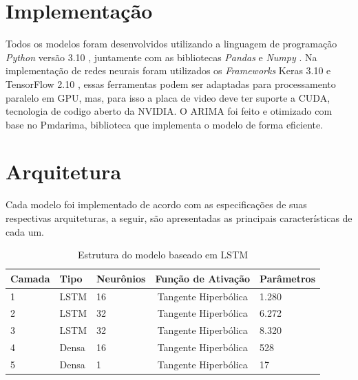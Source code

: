 \section{Implementação} \label{sec:implementacao}
Todos os modelos foram desenvolvidos utilizando a linguagem de programação \textit{Python} versão 3.10 \cite{ramalho}, juntamente com as bibliotecas \textit{Pandas} e \textit{Numpy} \cite{Data}. 
Na implementação de redes neurais foram utilizados os \textit{Frameworks} Keras 3.10 e TensorFlow 2.10 \cite{maosaobra}, essas ferramentas podem ser adaptadas para processamento paralelo em GPU, mas, para isso a placa de video deve ter suporte a CUDA, tecnologia de codigo aberto da NVIDIA.
O ARIMA foi feito e otimizado com base no Pmdarima, biblioteca que implementa o modelo de forma eficiente.

\section{Arquitetura} \label{sec:arquitetura}
Cada modelo foi implementado de acordo com as especificações de suas respectivas arquiteturas, a seguir, são apresentadas as principais características de cada um.

\begin{table}[h!] \label{tabela:lstm_struct}
    \caption{Estrutura do modelo baseado em LSTM}
    \begin{tabularx}{\textwidth}{X|X|X|c|X} \hline
    Camada & Tipo & Neurônios & Função de Ativação & Parâmetros \\ \hline
    1 & LSTM                    & 16 & Tangente Hiperbólica                           & 1.280                  \\ \hline
    2 & LSTM                    & 32 & Tangente Hiperbólica                            & 6.272                  \\ \hline
    3 & LSTM                    & 32 & Tangente Hiperbólica                            & 8.320                  \\ \hline
    4 & Densa                   & 16 & Tangente Hiperbólica                            & 528                    \\ \hline
    5 & Densa                   & 1  & Tangente Hiperbólica                           & 17                     \\ \hline
    \end{tabularx}
\end{table}

